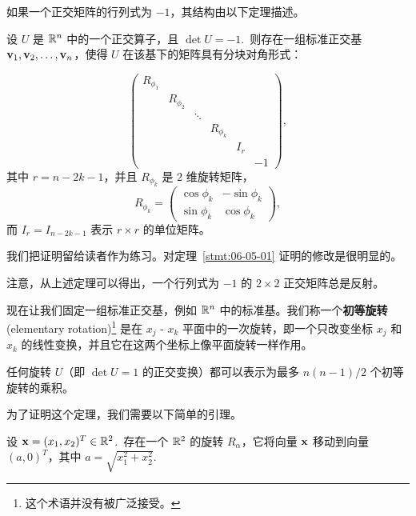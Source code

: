 

如果一个正交矩阵的行列式为 $-1$，其结构由以下定理描述。

\begin{theorem}\label{stmt:06-05-02}  设 $U$ 是 $\mathbb{R}^n$ 中的一个正交算子，且 $\det U = -1$.~则存在一组标准正交基 $\mathbf{v}_1, \mathbf{v}_2, \dots, \mathbf{v}_n$，使得 $U$ 在该基下的矩阵具有分块对角形式：\end{theorem}
$$\begin{pmatrix} R_{\phi_1} & & & & & \\ & R_{\phi_2} & & & & \\ & & \ddots & & & \\ & & & R_{\phi_k} & & \\ & & & & I_r & \\ & & & & & -1 \end{pmatrix},$$
其中 $r = n - 2k - 1$，并且 $R_{\phi_k}$ 是 $2$ 维旋转矩阵，
$$R_{\phi_k} = \begin{pmatrix} \cos \phi_k & -\sin \phi_k \\ \sin \phi_k & \cos \phi_k \end{pmatrix},$$
而 $I_r=I_{n-2k-1}$ 表示 $r \times r$ 的单位矩阵。

我们把证明留给读者作为练习。对定理~\ref{stmt:06-05-01} 证明的修改是很明显的。

注意，从上述定理可以得出，一个行列式为 $-1$ 的 $2 \times 2$ 正交矩阵总是反射。

现在让我们固定一组标准正交基，例如 $\mathbb{R}^n$ 中的标准基。我们称一个\textbf{初等旋转}(elementary rotation)\footnote{
这个术语并没有被广泛接受。
}
是在 $x_j$ - $x_k$ 平面中的一次旋转，即一个只改变坐标 $x_j$ 和 $x_k$ 的线性变换，并且它在这两个坐标上像平面旋转一样作用。

\begin{theorem}\label{stmt:06-05-03} 任何旋转 $U$（即 $\det U = 1$ 的正交变换）都可以表示为最多 $n(n-1)/2$ 个初等旋转的乘积。\end{theorem}

为了证明这个定理，我们需要以下简单的引理。

\begin{lemma}\label{stmt:06-05-04}设 $\mathbf{x} = (x_1, x_2)^T \in \mathbb{R}^2$.~存在一个 $\mathbb{R}^2$ 的旋转 $R_\alpha$，它将向量 $\mathbf{x}$ 移动到向量 $(a, 0)^T$，其中 $a = \sqrt{x_1^2 + x_2^2}$.~\end{lemma}

